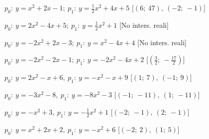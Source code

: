 \begin{esercizio}
\begin{enumeratea}
  \item  \(p_0:~y=x^2 +2 x -1;~p_1:~y=\frac{1}{2} x^2 +4 x +5\)
   \hfill [\(\left (6;~47 \right ),~\left (-2;~-1 \right )\)]
  \item  \(p_0:~y=2 x^2 -4 x +5;~p_1:~y=\frac{1}{2} x^2 +1\)
   \hfill [No inters. reali]
  \item  \(p_0:~y=-2 x^2 +2 x -3;~p_1:~y=x^2 -4 x +4\)
   \hfill [No inters. reali]
  \item  \(p_0:~y=-2 x^2 -2 x -1;~p_1:~y=-2 x^2 -4 x +2\)
   \hfill [\(\left (\frac{3}{2};~-\frac{17}{2} \right )\)]
% 
  \item  \(p_0:~y=2 x^2 - x +6,~p_1:~y=- x^2 - x +9\)
   \hfill [\(\left (1;~7 \right ),~\left (-1;~9 \right )\)]
  \item  \(p_0:~y=-3 x^2 -8,~p_1:~y=-8 x^2 -3\)
   \hfill [\(\left (-1;~-11 \right ),~\left (1;~-11 \right )\)]
  \item  \(p_0:~y=- x^2 +3,~p_1:~y=-\frac{1}{2} x^2 +1\)
   \hfill [\(\left (-2;~-1 \right ),~\left (2;~-1 \right )\)]
  \item  \(p_0:~y=x^2 +2 x +2,~p_1:~y=- x^2 +6\)
   \hfill [\(\left (-2;~2 \right ),~\left (1;~5 \right )\)]

\end{enumeratea}
\end{esercizio}
